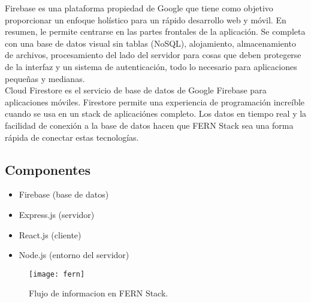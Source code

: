 Firebase es una plataforma propiedad de Google que tiene como objetivo proporcionar un enfoque holístico para un rápido desarrollo web y móvil. En resumen, le permite centrarse en las partes frontales de la aplicación. Se completa con una base de datos visual sin tablas (NoSQL), alojamiento, almacenamiento de archivos, procesamiento del lado del servidor para cosas que deben protegerse de la interfaz y un sistema de autenticación, todo lo necesario para aplicaciones pequeñas y medianas. \\[0.8cm]
Cloud Firestore es el servicio de base de datos de Google Firebase para aplicaciones móviles. Firestore permite una experiencia de programación increíble cuando se usa en un stack de aplicaciónes completo. Los datos en tiempo real y la facilidad de conexión a la base de datos hacen que FERN Stack sea una forma rápida de conectar estas tecnologías. 
\subsection{Componentes}
\begin{itemize}
  \item Firebase (base de datos)
  \item Express.js (servidor)
  \item React.js (cliente)
  \item Node.js (entorno del servidor)
\end{itemize}
\begin{figure}[H]
  \centering
  \texttt{[image: fern]}
  \caption{Flujo de informacion en FERN Stack.}
\end{figure}

